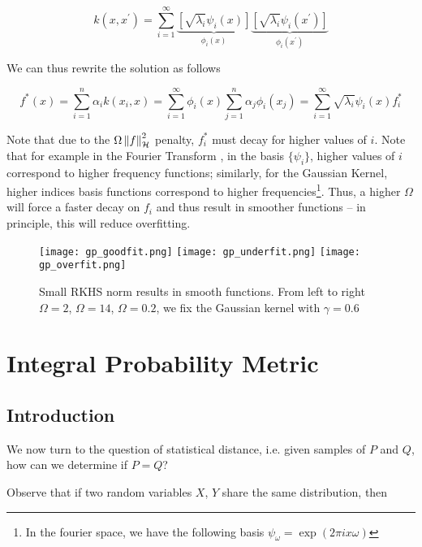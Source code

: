 $$
    k \left(x, x^{\prime}\right)=\sum_{i=1}^{\infty} 
    \underbrace{\left[\sqrt{\lambda_{i}} \psi_{i}(x)\right]}_{\phi_{i}(x)} 
    \underbrace{\left[\sqrt{\lambda_{i}} \psi_{i}\left(x^{\prime}\right)\right]}_{\phi_{i}\left(x^{\prime}\right)}
$$

We can thus rewrite the solution as follows

$$
    f^{*}(x) = \sum_{i=1}^{n} \alpha_{i} k\left(x_i, x\right) = 
    \sum_{i=1}^{\infty} \phi_i\left(x\right) 
    \sum_{j=1}^{n} \alpha_{j}  \phi_i\left(x_j\right) = 
    \sum_{i=1}^{\infty} \sqrt{\lambda_{i}} \psi_{i}(x) f^{*}_i 
$$

Note that due to the $\Omega \left\lVert f\right\rVert_{\mathcal{H}}^{2}$ penalty, $f^{*}_i$ must decay for higher values of $i$. Note that
for example in the Fourier Transform
, in the basis $\{\psi_i\}$, higher values of $i$ correspond to higher 
frequency functions; similarly, for the Gaussian Kernel, higher indices basis functions correspond to 
higher frequencies\footnote{In the fourier space, we have the following
basis $\psi_\omega = \exp (2\pi i x \omega)$}. Thus, a higher $\Omega$ will force a faster decay on $f_i$ and thus result in smoother functions
-- in principle, this will reduce overfitting. 

\begin{figure}[H]

    \centering
    \texttt{[image: gp\_goodfit.png]} 
    \texttt{[image: gp\_underfit.png]} 
    \texttt{[image: gp\_overfit.png]} 
    \caption{Small RKHS norm results in smooth functions. 
    From left to right $\Omega = 2$, $\Omega = 14$, $\Omega = 0.2$, 
    we fix the Gaussian kernel with $\gamma = 0.6$}
    \label{fig:kernel_smoothness}  
\end{figure}


\section{Integral Probability Metric}

\subsection{Introduction}

We now turn to the question of statistical distance, i.e. given samples of $P$ and
$Q$, how can we determine if $P = Q$?

Observe that if two random variables $X$, $Y$ share the same distribution, then 

